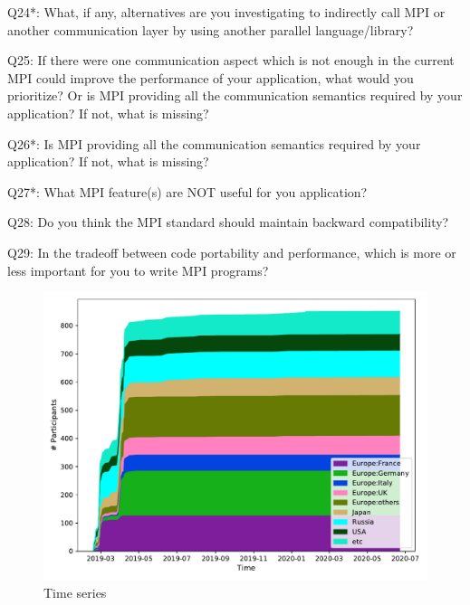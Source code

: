 \begin{description}
\item{Q24*:} What, if any, alternatives are you investigating to indirectly call MPI or another communication layer by using another parallel language/library?
\item{Q25:} If there were one communication aspect which is not enough in the current MPI could improve the performance of your application, what would you prioritize? Or is MPI providing all the communication semantics required by your application? If not, what is missing?
\item{Q26*:} Is MPI providing all the communication semantics required by your application? If not, what is missing?
\item{Q27*:} What MPI feature(s) are NOT useful for you application?
\item{Q28:} Do you think the MPI standard should maintain backward compatibility?
\item{Q29:} In the tradeoff between code portability and performance, which is more or less important for you to write MPI programs?
\end{description}



\begin{figure}[htb]
\begin{center}
\includegraphics[width=12cm]{../pdfs/TimeSeries.pdf}
\caption{Time series}
\label{fig:timeseries}
\end{center}
\end{figure}
